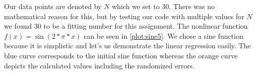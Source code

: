 \documentclass{article}
\newcommand{\sqboxs}{1.2ex}%
\newcommand{\sqbox}[1]{\textcolor{#1}{\rule{\sqboxs}{\sqboxs}}}
\begin{document}
	Our data points are denoted by $N$ which we set to 30. There was no mathematical reason for this, but by testing our code with multiple values for $N$ we found 30 to be a fitting number for this assignment. The nonlinear function $f(x) = \sin(2*\pi*x)$ can be seen in \autoref{plot:sine5}. We chose a sine function because it is simplistic and let's us demonstrate the linear regression easily. The blue curve corresponds to the initial sine function whereas the orange curve depicts the calculated values including the randomized errors. \\
	
	
	
	
	
	
	
	
	\FloatBarrier
	
	
	
\end{document}
